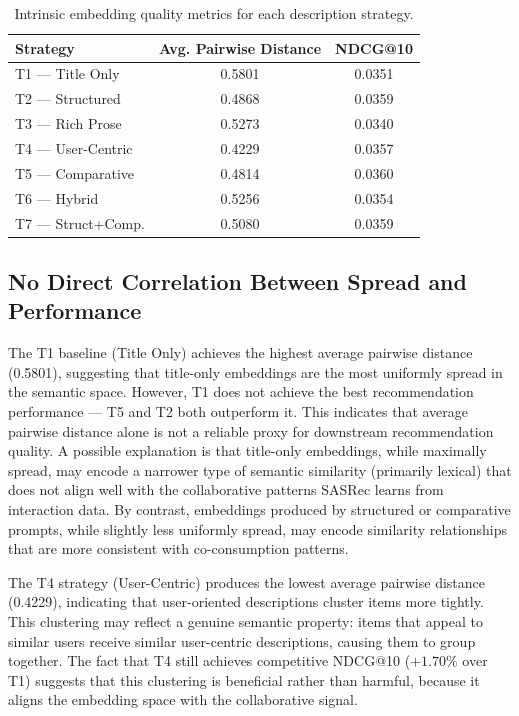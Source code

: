 \documentclass[12pt,a4paper]{report}
\begin{document}
\begin{table}[h]
\centering
\caption{Intrinsic embedding quality metrics for each description strategy.}
\label{tab:embedding_quality}
\begin{tabular}{p{2.6cm} c c}
\toprule
\textbf{Strategy} & \textbf{Avg. Pairwise Distance} & \textbf{NDCG@10} \\
\midrule
T1 — Title Only    & 0.5801 & 0.0351 \\
T2 — Structured    & 0.4868 & 0.0359 \\
T3 — Rich Prose    & 0.5273 & 0.0340 \\
T4 — User-Centric  & 0.4229 & 0.0357 \\
T5 — Comparative   & 0.4814 & 0.0360 \\
T6 — Hybrid        & 0.5256 & 0.0354 \\
T7 — Struct+Comp.  & 0.5080 & 0.0359 \\
\bottomrule
\end{tabular}
\end{table}

\subsection*{No Direct Correlation Between Spread and Performance}

The T1 baseline (Title Only) achieves the highest average pairwise distance
(0.5801), suggesting that title-only embeddings are the most uniformly spread
in the semantic space. However, T1 does not achieve the best recommendation
performance — T5 and T2 both outperform it. This indicates that average
pairwise distance alone is not a reliable proxy for downstream recommendation
quality. A possible explanation is that title-only embeddings, while maximally
spread, may encode a narrower type of semantic similarity (primarily lexical)
that does not align well with the collaborative patterns SASRec learns from
interaction data. By contrast, embeddings produced by structured or comparative
prompts, while slightly less uniformly spread, may encode similarity
relationships that are more consistent with co-consumption patterns.

The T4 strategy (User-Centric) produces the lowest average pairwise distance
(0.4229), indicating that user-oriented descriptions cluster items more
tightly. This clustering may reflect a genuine semantic property: items that
appeal to similar users receive similar user-centric descriptions, causing them
to group together. The fact that T4 still achieves competitive NDCG@10
($+1.70\%$ over T1) suggests that this clustering is beneficial rather than
harmful, because it aligns the embedding space with the collaborative signal.
\end{document}
